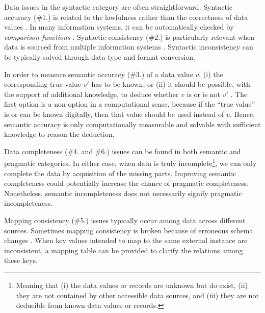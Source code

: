 Data issues in the syntactic category are often straightforward. Syntactic accuracy (\#1.) is related to the lawfulness rather than the correctness of data values \citep{Wand1996,}. In many information systems, it can be automatically checked by \textit{comparison functions} \citep{Batini2006}. 
Syntactic consistency (\#2.) is particularly relevant when data is sourced from multiple information systems \citep{Shanks1999}. Syntactic inconsistency can be typically solved through data type and format conversion. 

In order to measure semantic accuracy (\#3.) of a data value $v$, (i) the corresponding true value $v'$ has to be known, or (ii) it should be possible, with the support of additional knowledge, to deduce whether $v$ is or is not $v'$ \citep{Batini2006}.
The first option is a non-option in a computational sense, because if the ``true value'' is or can be known digitally, then that value should be used instead of $v$. Hence, semantic accuracy is only computationally measurable and solvable with sufficient knowledge to reason the deduction. %

Data completeness (\#4. and \#6.) issues can be found in both semantic and pragmatic categories. In either case, when data is truly incomplete\footnote{Meaning that (i) the data values or records are unknown but do exist, (ii) they are not contained by other accessible data sources, and (iii) they are not deducible from known data values or records.}, we can only complete the data by acquisition of the missing parts. 
Improving semantic completeness could potentially increase the chance of pragmatic completeness.
Nonetheless, semantic incompleteness does not necessarily signify pragmatic incompleteness. 

Mapping consistency (\#5.) issues typically occur among data across different sources. Sometimes mapping consistency is broken because of erroneous schema changes \citep{Velegrakis2004}. 
When key values intended to map to the same external instance are inconsistent, a mapping table can be provided to clarify the %
relations among these keys. %

